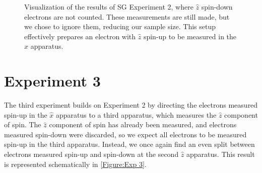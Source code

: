 \begin{figure}[!t]
\centering\CaptionFontSize
{}

\caption[Insert an abbreviated caption here to show in the List of Figures]
{Visualization of the results of SG Experiment 2, where $\hat{z}$ spin-down electrons are not counted. These measurements are still made, but we chose to ignore them, reducing our sample size. This setup effectively prepares an electron with $\hat{z}$ spin-up to be measured in the $\hat{x}$ apparatus.}
\label{Figure:Exp 2 renormalized}
\end{figure}

\section{Experiment 3}
The third experiment builds on Experiment 2 by directing the electrons measured spin-up in the $\hat{x}$ apparatus to a third apparatus, which measures the $\hat{z}$ component of spin. The $\hat{z}$ component of spin has already been measured, and electrons measured spin-down were discarded, so we expect all electrons to be measured spin-up in the third apparatus. Instead, we once again find an even split between electrons measured spin-up and spin-down at the second $\hat{z}$ apparatus. This result is represented schematically in \autoref{Figure:Exp 3}.

